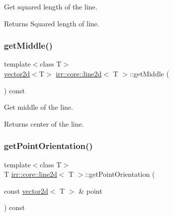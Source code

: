 Get squared length of the line. 

\begin{DoxyReturn}{Returns}
Squared length of line. 
\end{DoxyReturn}
\mbox{\label{classirr_1_1core_1_1line2d_a18c94540c89997e0a4acc96e08f6f4a0}} 
\subsubsection{\texorpdfstring{get\+Middle()}{getMiddle()}}
{\footnotesize\ttfamily template$<$class T$>$ \\
\hyperlink{classirr_1_1core_1_1vector2d}{vector2d}$<$T$>$ \hyperlink{classirr_1_1core_1_1line2d}{irr\+::core\+::line2d}$<$ T $>$\+::get\+Middle (\begin{DoxyParamCaption}{ }\end{DoxyParamCaption}) const\hspace{0.3cm}{\ttfamily [inline]}}



Get middle of the line. 

\begin{DoxyReturn}{Returns}
center of the line. 
\end{DoxyReturn}
\mbox{\label{classirr_1_1core_1_1line2d_a85405d08c6e3ea55cdb39b60484f7275}} 
\subsubsection{\texorpdfstring{get\+Point\+Orientation()}{getPointOrientation()}}
{\footnotesize\ttfamily template$<$class T$>$ \\
T \hyperlink{classirr_1_1core_1_1line2d}{irr\+::core\+::line2d}$<$ T $>$\+::get\+Point\+Orientation (\begin{DoxyParamCaption}\item[{const \hyperlink{classirr_1_1core_1_1vector2d}{vector2d}$<$ T $>$ \&}]{point }\end{DoxyParamCaption}) const\hspace{0.3cm}{\ttfamily [inline]}}



